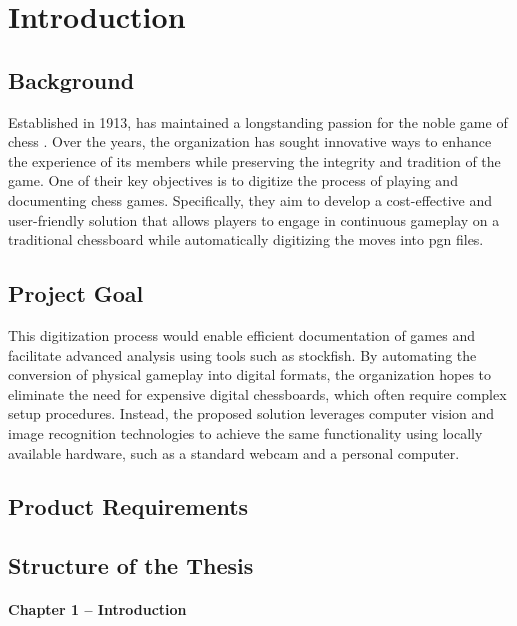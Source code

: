 \chapter{Introduction}

\section{Background}

Established in 1913, \aas has maintained a longstanding passion for the noble game of chess \cite{schaklag:63}. Over the years, the organization has sought innovative ways to enhance the experience of its members while preserving the integrity and tradition of the game. One of their key objectives is to digitize the process of playing and documenting chess games. Specifically, they aim to develop a cost-effective and user-friendly solution that allows players to engage in continuous gameplay on a traditional chessboard while automatically digitizing the moves into \gls{pgn} files.

\section{Project Goal}

This digitization process would enable efficient documentation of games and facilitate advanced analysis using tools such as \Gls{stockfish}. By automating the conversion of physical gameplay into digital formats, the organization hopes to eliminate the need for expensive digital chessboards, which often require complex setup procedures. Instead, the proposed solution leverages computer vision and image recognition technologies to achieve the same functionality using locally available hardware, such as a standard webcam and a personal computer.

\section{Product Requirements}



\section{Structure of the Thesis}

\subsubsection*{Chapter 1 -- Introduction}


